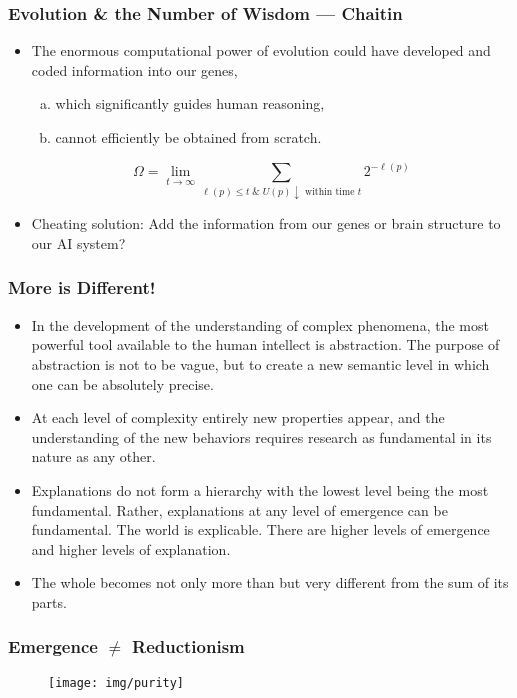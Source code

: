\documentclass[UTF8,11pt,colorlinks,compress,openany]{beamer}%
\begin{document}
\begin{frame}\frametitle{Evolution \& the Number of Wisdom --- Chaitin}
\begin{itemize}
	\item The enormous computational power of evolution could have developed and coded information into our genes,
	\begin{enumerate}[(a)]
		\item which significantly guides human reasoning,
		\item cannot efficiently be obtained from scratch.
	\end{enumerate}
\[\Omega=\lim\limits_{t\to\infty}\sum\limits_{\ell(p)\leq t\;\&\;U(p)\downarrow\text{ within time } t} 2^{-\ell(p)}\]
	\item Cheating solution: Add the information from our genes or brain structure to our AI system?
\end{itemize}
\end{frame}

\begin{frame}\frametitle{More is Different!}
\begin{itemize}
	\item In the development of the understanding of complex phenomena, the most powerful tool available to the human intellect is abstraction. The purpose of abstraction is not to be vague, but to create a new semantic level in which one can be absolutely precise.
	\item At each level of complexity entirely new properties appear, and the understanding of the new behaviors requires research as fundamental in its nature as any other.
	\item Explanations do not form a hierarchy with the lowest level being the most fundamental. Rather, explanations at any level of emergence can be fundamental. The world is explicable. There are higher levels of emergence and higher levels of explanation.
	\item The whole becomes not only more than but very different from the sum of its parts.
\end{itemize}
\end{frame}

\begin{frame}\frametitle{Emergence $\ne$ Reductionism}
	\begin{figure}
		\texttt{[image: img/purity]}
	\end{figure}
\end{frame}
\end{document}
